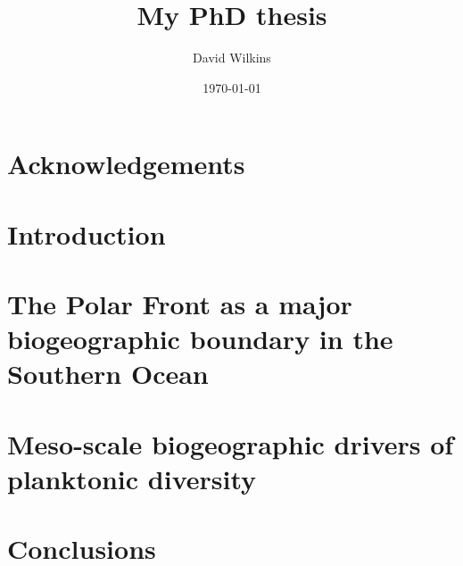 \documentclass[a4paper]{report}
\begin{document}
\title{My PhD thesis}
\author{David Wilkins}
\date{\today}

\maketitle

\tableofcontents
\listoffigures
\listoftables

\chapter*{Acknowledgements}

\begin{abstract}
\end{abstract}


\chapter{Introduction}
\label{ch:intro}

\chapter{The Polar Front as a major biogeographic boundary in the Southern Ocean}
\label{ch:method}

\chapter{Meso-scale biogeographic drivers of planktonic diversity}
\label{ch:results}

\chapter{Conclusions}
\label{ch:conc}



\end{document}
